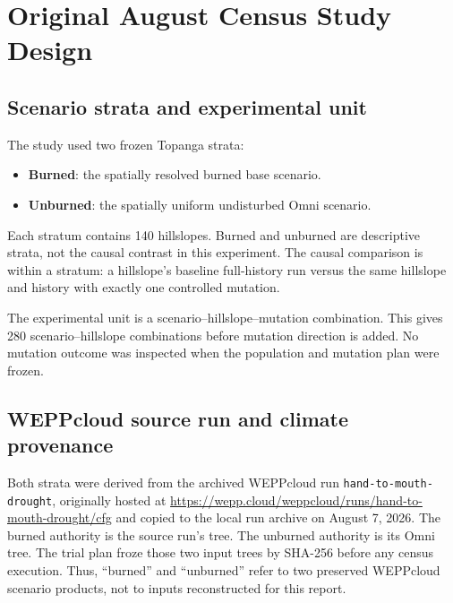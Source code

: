 \documentclass[11pt]{article}
\begin{document}


\section{Original August Census Study Design}

\subsection{Scenario strata and experimental unit}

The study used two frozen Topanga strata:

\begin{itemize}
  \item \textbf{Burned}: the spatially resolved burned base scenario.
  \item \textbf{Unburned}: the spatially uniform undisturbed Omni scenario.
\end{itemize}

Each stratum contains 140 hillslopes. Burned and unburned are descriptive
strata, not the causal contrast in this experiment. The causal comparison is
within a stratum: a hillslope's baseline full-history run versus the same
hillslope and history with exactly one controlled mutation.

The experimental unit is a scenario--hillslope--mutation combination. This
gives 280 scenario--hillslope combinations before mutation direction is added.
No mutation outcome was inspected when the population and mutation plan were
frozen.

\subsection{WEPPcloud source run and climate provenance}

Both strata were derived from the archived WEPPcloud run
\texttt{hand-to-mouth-drought}, originally hosted at
\url{https://wepp.cloud/weppcloud/runs/hand-to-mouth-drought/cfg} and copied to
the local run archive on August 7, 2026. The burned authority is the source
run's  tree. The unburned authority is its Omni
 tree. The trial plan froze those two input
trees by SHA-256 before any census execution. Thus, ``burned'' and
``unburned'' refer to two preserved WEPPcloud scenario products, not to inputs
reconstructed for this report.
\end{document}
